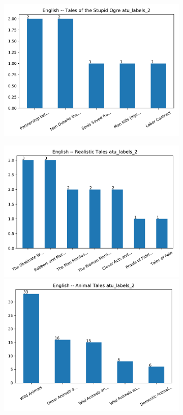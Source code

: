 \begin{figure}
\begin{subfigure}{.5\textwidth}
\includegraphics[width=0.9\linewidth]{plots/bars7.pdf}
\end{subfigure}%
\begin{subfigure}{.5\textwidth}
\centering
\includegraphics[width=0.9\linewidth]{plots/bars8.pdf}
\includegraphics[width=0.9\linewidth]{plots/bars9.pdf}

\end{subfigure}
\end{figure}
